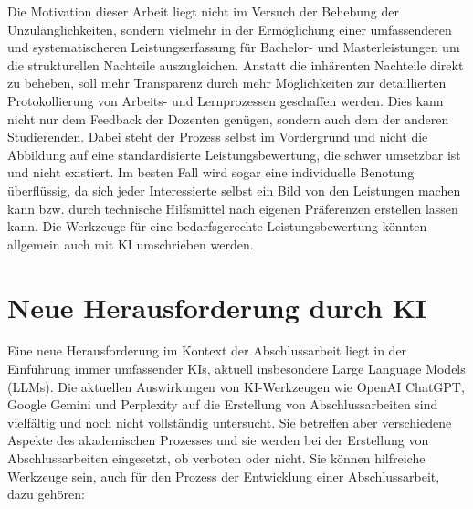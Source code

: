 \documentclass[conference]{IEEEtran}
\begin{document}
Die Motivation dieser Arbeit liegt nicht im Versuch der Behebung der Unzulänglichkeiten, sondern vielmehr in der Ermöglichung einer umfassenderen und systematischeren Leistungserfassung für Bachelor- und Masterleistungen um die strukturellen Nachteile auszugleichen. Anstatt die inhärenten Nachteile direkt zu beheben, soll mehr Transparenz durch mehr Möglichkeiten zur detaillierten Protokollierung von Arbeits- und Lernprozessen geschaffen werden. Dies kann nicht nur dem Feedback der Dozenten genügen, sondern auch dem der anderen Studierenden. Dabei steht der Prozess selbst im Vordergrund und nicht die Abbildung auf eine standardisierte Leistungsbewertung, die schwer umsetzbar ist und nicht existiert. Im besten Fall wird sogar eine individuelle Benotung überflüssig, da sich jeder Interessierte selbst ein Bild von den Leistungen machen kann bzw. durch technische Hilfsmittel nach eigenen Präferenzen erstellen lassen kann. Die Werkzeuge für eine bedarfsgerechte Leistungsbewertung könnten allgemein auch mit KI umschrieben werden.


\section{Neue Herausforderung durch KI}

Eine neue Herausforderung im Kontext der Abschlussarbeit liegt in der Einführung immer umfassender KIs, aktuell insbesondere Large Language Models (LLMs). Die aktuellen Auswirkungen von KI-Werkzeugen wie OpenAI ChatGPT, Google Gemini und Perplexity auf die Erstellung von Abschlussarbeiten sind vielfältig und  noch nicht vollständig untersucht. Sie betreffen aber verschiedene Aspekte des akademischen Prozesses und sie werden bei der Erstellung von Abschlussarbeiten eingesetzt, ob verboten oder nicht. Sie können hilfreiche Werkzeuge sein, auch für den Prozess der Entwicklung einer Abschlussarbeit, dazu gehören:
\end{document}
